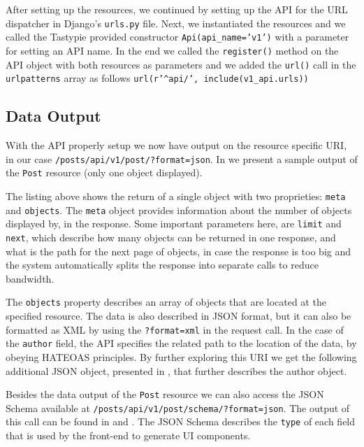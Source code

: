 After setting up the resources, we continued by setting up the API for the URL dispatcher in Django's \texttt{urls.py} file. Next, we instantiated the resources and we called the Tastypie provided constructor \texttt{Api(api\_name='v1')} with a parameter for setting an API name. In the end we called the \texttt{register()} method on the API object with both resources as parameters and we added the \texttt{url()} call in the \texttt{urlpatterns} array as follows \texttt{url(r'\^{}api/', include(v1\_api.urls))}

\subsection{Data Output}
\label{sub-sec:output}

With the API properly setup we now have output on the resource specific URI, in our case \texttt{/posts/api/v1/post/?format=json}. In  we present a sample output of the \texttt{Post} resource (only one object displayed).

	

The listing above shows the return of a single object with two proprieties: \texttt{meta} and \texttt{objects}. The \texttt{meta} object provides information about the number of objects displayed by, in the response. Some important parameters here, are \texttt{limit} and \texttt{next}, which describe how many objects can be returned in one response, and what is the path for the next page of objects, in case the response is too big and the system automatically splits the response into separate calls to reduce bandwidth. 

The \texttt{objects} property describes an array of objects that are located at the specified resource. The data is also described in JSON format, but it can also be formatted as XML by using the \texttt{?format=xml} in the request call. In the case of the \texttt{author} field, the API specifies the related path to the location of the data, by obeying HATEOAS principles. By further exploring this URI we get the following additional JSON object, presented in , that further describes the author object. 





Besides the data output of the \texttt{Post} resource we can also access the JSON Schema available at  \texttt{/posts/api/v1/post/schema/?format=json}. The output of this call can be found in  and . The JSON Schema describes the \texttt{type} of each field that is used by the front-end to generate UI components. 

